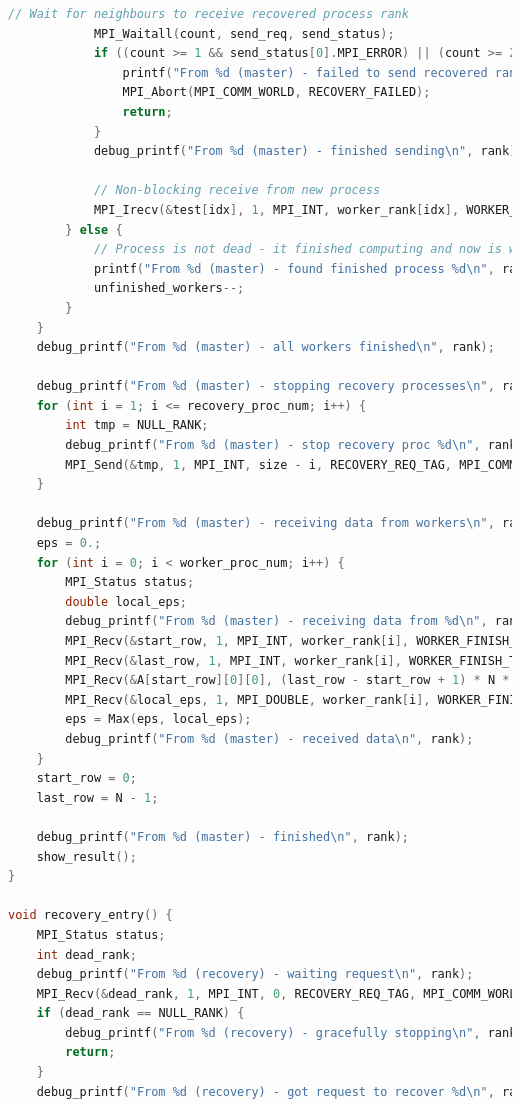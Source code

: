\documentclass[a4paper]{article}
\begin{document}
\begin{lstlisting}[caption=jac\_3d\_mpi\_ft.c, label={lst:2}, language=C]
            // Wait for neighbours to receive recovered process rank
            MPI_Waitall(count, send_req, send_status);
            if ((count >= 1 && send_status[0].MPI_ERROR) || (count >= 2 && send_status[1].MPI_ERROR)) {
                printf("From %d (master) - failed to send recovered rank\n", rank);
                MPI_Abort(MPI_COMM_WORLD, RECOVERY_FAILED);
                return;
            }
            debug_printf("From %d (master) - finished sending\n", rank);

            // Non-blocking receive from new process
            MPI_Irecv(&test[idx], 1, MPI_INT, worker_rank[idx], WORKER_FINISH_TAG, MPI_COMM_WORLD, &test_request[idx]);
        } else {
            // Process is not dead - it finished computing and now is waiting to send its data
            printf("From %d (master) - found finished process %d\n", rank, worker_rank[idx]);
            unfinished_workers--;
        }
    }
    debug_printf("From %d (master) - all workers finished\n", rank);

    debug_printf("From %d (master) - stopping recovery processes\n", rank);
    for (int i = 1; i <= recovery_proc_num; i++) {
        int tmp = NULL_RANK;
        debug_printf("From %d (master) - stop recovery proc %d\n", rank, size - i);
        MPI_Send(&tmp, 1, MPI_INT, size - i, RECOVERY_REQ_TAG, MPI_COMM_WORLD);
    }

    debug_printf("From %d (master) - receiving data from workers\n", rank);
    eps = 0.;
    for (int i = 0; i < worker_proc_num; i++) {
        MPI_Status status;
        double local_eps;
        debug_printf("From %d (master) - receiving data from %d\n", rank, worker_rank[i]);
        MPI_Recv(&start_row, 1, MPI_INT, worker_rank[i], WORKER_FINISH_TAG, MPI_COMM_WORLD, &status);
        MPI_Recv(&last_row, 1, MPI_INT, worker_rank[i], WORKER_FINISH_TAG, MPI_COMM_WORLD, &status);
        MPI_Recv(&A[start_row][0][0], (last_row - start_row + 1) * N * N, MPI_DOUBLE, worker_rank[i], WORKER_FINISH_TAG, MPI_COMM_WORLD, &status);
        MPI_Recv(&local_eps, 1, MPI_DOUBLE, worker_rank[i], WORKER_FINISH_TAG, MPI_COMM_WORLD, &status);
        eps = Max(eps, local_eps);
        debug_printf("From %d (master) - received data\n", rank);
    }
    start_row = 0;
    last_row = N - 1;

    debug_printf("From %d (master) - finished\n", rank);
    show_result();
}

void recovery_entry() {
    MPI_Status status;
    int dead_rank;
    debug_printf("From %d (recovery) - waiting request\n", rank);
    MPI_Recv(&dead_rank, 1, MPI_INT, 0, RECOVERY_REQ_TAG, MPI_COMM_WORLD, &status);
    if (dead_rank == NULL_RANK) {
        debug_printf("From %d (recovery) - gracefully stopping\n", rank);
        return;
    }
    debug_printf("From %d (recovery) - got request to recover %d\n", rank, dead_rank);


\end{lstlisting}
\end{document}
